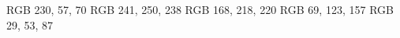 \definecolor{imperialRed}  {RGB} {230,  57,  70}
\definecolor{honeydew}     {RGB} {241, 250, 238}
\definecolor{powderBlue}   {RGB} {168, 218, 220}
\definecolor{celadonBlue}  {RGB} { 69, 123, 157}
\definecolor{prussianBlue} {RGB} { 29,  53,  87}
